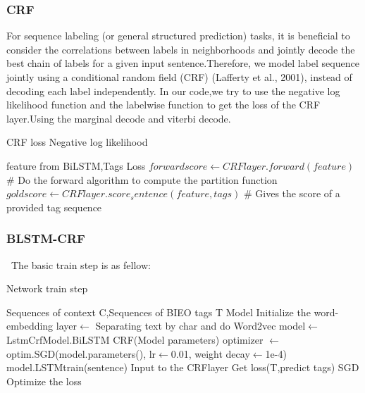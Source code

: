 \documentclass{llncs}
\begin{document}
\subsubsection{CRF}
For sequence labeling (or general structured prediction) tasks, it is beneficial to consider the correlations between labels in neighborhoods and jointly decode the best chain of labels for a given input sentence.Therefore, we model
label sequence jointly using a conditional random field (CRF) (Lafferty et al., 2001), instead of decoding each label independently.
In our code,we try to use the negative log likelihood function and the
labelwise function to get the loss of the CRF layer.Using the marginal decode
and viterbi decode.
 
\renewcommand{\algorithmicrequire}{\textbf{input:}}  
\renewcommand{\algorithmicensure}{\textbf{output:}}  
	\begin{algorithm}  
		\caption{CRF loss Negative log likelihood}  
		\begin{algorithmic}[1]  
			\Require feature from BiLSTM,Tags  
			\Ensure Loss  
			\State $forward score \gets CRFlayer.forward(feature)$
			\State \# Do the forward algorithm to compute the partition function
			\State $gold score \gets CRFlayer.score_sentence(feature,tags)$
			\State \# Gives the score of a provided tag sequence
			\State {}  
			\EndFunction 
		\end{algorithmic}  
	\end{algorithm} 

 
\subsubsection{BLSTM-CRF}
\
The basic train step is as fellow:
\begin{algorithm}  
	\caption{Network train step}  
	\begin{algorithmic}[1]  
		\Require Sequences of context C,Sequences of BIEO tags T 
		\Ensure Model   
		\State Initialize the word-embedding layer$\gets$ Separating text by char and do Word2vec
		\State model$\gets$LstmCrfModel.BiLSTM CRF(Model parameters)
		\State optimizer $\gets$ optim.SGD(model.parameters(), lr$\gets$0.01, weight decay$\gets$1e-4)
		\For {in range(epcho)}
		 \State model.LSTMtrain(sentence)
		 \State Input to the CRFlayer
		 \EndFor
		 \State Get loss(T,predict tags)
		 \State SGD Optimize the loss
		 \EndFor
		\State {}  
	\end{algorithmic}  
\end{algorithm} 
\end{document}
